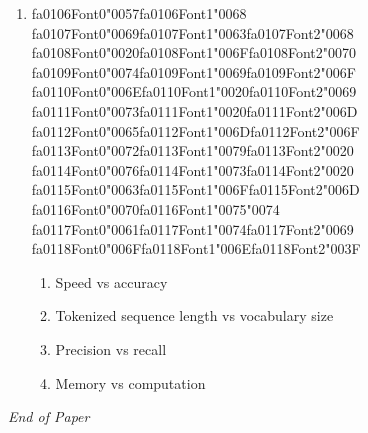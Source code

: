 \documentclass[12pt]{article}
\begin{document}
\begin{enumerate}[label=Q\arabic*.]
\item {\csname fa0106Font0\endcsname\char"0057}{\csname fa0106Font1\endcsname\char"0068} {\csname fa0107Font0\endcsname\char"0069}{\csname fa0107Font1\endcsname\char"0063}{\csname fa0107Font2\endcsname\char"0068} {\csname fa0108Font0\endcsname\char"0020}{\csname fa0108Font1\endcsname\char"006F}{\csname fa0108Font2\endcsname\char"0070} {\csname fa0109Font0\endcsname\char"0074}{\csname fa0109Font1\endcsname\char"0069}{\csname fa0109Font2\endcsname\char"006F} {\csname fa0110Font0\endcsname\char"006E}{\csname fa0110Font1\endcsname\char"0020}{\csname fa0110Font2\endcsname\char"0069} {\csname fa0111Font0\endcsname\char"0073}{\csname fa0111Font1\endcsname\char"0020}{\csname fa0111Font2\endcsname\char"006D} {\csname fa0112Font0\endcsname\char"0065}{\csname fa0112Font1\endcsname\char"006D}{\csname fa0112Font2\endcsname\char"006F} {\csname fa0113Font0\endcsname\char"0072}{\csname fa0113Font1\endcsname\char"0079}{\csname fa0113Font2\endcsname\char"0020} {\csname fa0114Font0\endcsname\char"0076}{\csname fa0114Font1\endcsname\char"0073}{\csname fa0114Font2\endcsname\char"0020} {\csname fa0115Font0\endcsname\char"0063}{\csname fa0115Font1\endcsname\char"006F}{\csname fa0115Font2\endcsname\char"006D} {\csname fa0116Font0\endcsname\char"0070}{\csname fa0116Font1\endcsname\char"0075}{\char"0074} {\csname fa0117Font0\endcsname\char"0061}{\csname fa0117Font1\endcsname\char"0074}{\csname fa0117Font2\endcsname\char"0069} {\csname fa0118Font0\endcsname\char"006F}{\csname fa0118Font1\endcsname\char"006E}{\csname fa0118Font2\endcsname\char"003F}
\begin{enumerate}[label=(\Alph*)]
    \item Speed vs accuracy
    \item Tokenized sequence length vs vocabulary size
    \item Precision vs recall
    \item Memory vs computation
\end{enumerate}
\end{enumerate}

\vfill
\noindent\textit{End of Paper}
\end{document}
